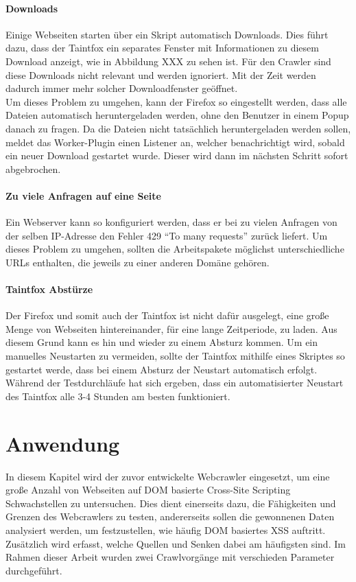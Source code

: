 \subsubsection{Downloads}
Einige Webseiten starten über ein Skript automatisch Downloads. Dies führt dazu, dass der Taintfox ein separates Fenster mit Informationen zu diesem Download anzeigt, wie in Abbildung XXX zu sehen ist. Für den Crawler sind diese Downloads nicht relevant und werden ignoriert. Mit der Zeit werden dadurch immer mehr solcher Downloadfenster geöffnet. \\
Um dieses Problem zu umgehen, kann der Firefox so eingestellt werden, dass alle Dateien automatisch heruntergeladen werden, ohne den Benutzer in einem Popup danach zu fragen. Da die Dateien nicht tatsächlich heruntergeladen werden sollen, meldet das Worker-Plugin einen Listener an, welcher benachrichtigt wird, sobald ein neuer Download gestartet wurde. Dieser wird dann im nächsten Schritt sofort abgebrochen.
\subsubsection{Zu viele Anfragen auf eine Seite}
Ein Webserver kann so konfiguriert werden, dass er bei zu vielen Anfragen von der selben IP-Adresse den Fehler 429 \enquote{To many requests} zurück liefert. Um dieses Problem zu umgehen, sollten die Arbeitspakete möglichst unterschiedliche URLs enthalten, die jeweils zu einer anderen Domäne gehören.
\subsubsection{Taintfox Abstürze}
Der Firefox und somit auch der Taintfox ist nicht dafür ausgelegt, eine große Menge von Webseiten hintereinander, für eine lange Zeitperiode, zu laden. Aus diesem Grund kann es hin und wieder zu einem Absturz kommen. Um ein manuelles Neustarten zu vermeiden, sollte der Taintfox mithilfe eines Skriptes so gestartet werde, dass bei einem Absturz der Neustart automatisch erfolgt. Während der Testdurchläufe hat sich ergeben, dass ein automatisierter Neustart des Taintfox alle 3-4 Stunden am besten funktioniert.

\chapter{Anwendung}
In diesem Kapitel wird der zuvor entwickelte Webcrawler eingesetzt, um eine große Anzahl von Webseiten auf DOM basierte Cross-Site Scripting Schwachstellen zu untersuchen. Dies dient einerseits dazu, die Fähigkeiten und Grenzen des Webcrawlers zu testen, andererseits sollen die gewonnenen Daten analysiert werden, um festzustellen, wie häufig DOM basiertes XSS auftritt. Zusätzlich wird erfasst, welche Quellen und Senken dabei am häufigsten sind. Im Rahmen dieser Arbeit wurden zwei Crawlvorgänge mit verschieden Parameter durchgeführt.
